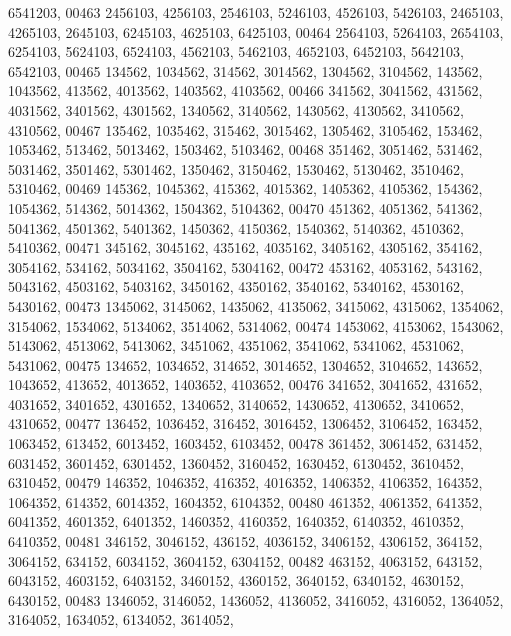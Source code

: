 \begin{DoxyCode}
      6541203,
00463       2456103, 4256103, 2546103, 5246103, 4526103, 5426103, 2465103, 4265103, 2645103, 6245103, 4625103, 
      6425103,
00464       2564103, 5264103, 2654103, 6254103, 5624103, 6524103, 4562103, 5462103, 4652103, 6452103, 5642103, 
      6542103,
00465        134562, 1034562,  314562, 3014562, 1304562, 3104562,  143562, 1043562,  413562, 4013562, 1403562, 
      4103562,
00466        341562, 3041562,  431562, 4031562, 3401562, 4301562, 1340562, 3140562, 1430562, 4130562, 3410562, 
      4310562,
00467        135462, 1035462,  315462, 3015462, 1305462, 3105462,  153462, 1053462,  513462, 5013462, 1503462, 
      5103462,
00468        351462, 3051462,  531462, 5031462, 3501462, 5301462, 1350462, 3150462, 1530462, 5130462, 3510462, 
      5310462,
00469        145362, 1045362,  415362, 4015362, 1405362, 4105362,  154362, 1054362,  514362, 5014362, 1504362, 
      5104362,
00470        451362, 4051362,  541362, 5041362, 4501362, 5401362, 1450362, 4150362, 1540362, 5140362, 4510362, 
      5410362,
00471        345162, 3045162,  435162, 4035162, 3405162, 4305162,  354162, 3054162,  534162, 5034162, 3504162, 
      5304162,
00472        453162, 4053162,  543162, 5043162, 4503162, 5403162, 3450162, 4350162, 3540162, 5340162, 4530162, 
      5430162,
00473       1345062, 3145062, 1435062, 4135062, 3415062, 4315062, 1354062, 3154062, 1534062, 5134062, 3514062, 
      5314062,
00474       1453062, 4153062, 1543062, 5143062, 4513062, 5413062, 3451062, 4351062, 3541062, 5341062, 4531062, 
      5431062,
00475        134652, 1034652,  314652, 3014652, 1304652, 3104652,  143652, 1043652,  413652, 4013652, 1403652, 
      4103652,
00476        341652, 3041652,  431652, 4031652, 3401652, 4301652, 1340652, 3140652, 1430652, 4130652, 3410652, 
      4310652,
00477        136452, 1036452,  316452, 3016452, 1306452, 3106452,  163452, 1063452,  613452, 6013452, 1603452, 
      6103452,
00478        361452, 3061452,  631452, 6031452, 3601452, 6301452, 1360452, 3160452, 1630452, 6130452, 3610452, 
      6310452,
00479        146352, 1046352,  416352, 4016352, 1406352, 4106352,  164352, 1064352,  614352, 6014352, 1604352, 
      6104352,
00480        461352, 4061352,  641352, 6041352, 4601352, 6401352, 1460352, 4160352, 1640352, 6140352, 4610352, 
      6410352,
00481        346152, 3046152,  436152, 4036152, 3406152, 4306152,  364152, 3064152,  634152, 6034152, 3604152, 
      6304152,
00482        463152, 4063152,  643152, 6043152, 4603152, 6403152, 3460152, 4360152, 3640152, 6340152, 4630152, 
      6430152,
00483       1346052, 3146052, 1436052, 4136052, 3416052, 4316052, 1364052, 3164052, 1634052, 6134052, 3614052, 

\end{DoxyCode}
